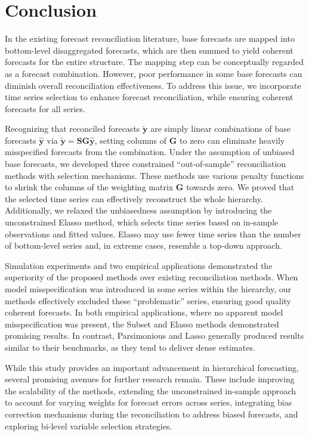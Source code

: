 \documentclass[
  11pt]{article}
\theoremstyle{plain}
\theoremstyle{remark}
\begin{document}
\section{Conclusion}\label{sec-conclusion}

In the existing forecast reconciliation literature, base forecasts are
mapped into bottom-level disaggregated forecasts, which are then summed
to yield coherent forecasts for the entire structure. The mapping step
can be conceptually regarded as a forecast combination. However, poor
performance in some base forecasts can diminish overall reconciliation
effectiveness. To address this issue, we incorporate time series
selection to enhance forecast reconciliation, while ensuring coherent
forecasts for all series.

Recognizing that reconciled forecasts \(\tilde{\bm{y}}\) are simply
linear combinations of base forecasts \(\hat{\bm{y}}\) via
\(\tilde{\bm{y}}=\bm{SG}\hat{\bm{y}}\), setting columns of \(\bm{G}\) to
zero can eliminate heavily misspecified forecasts from the combination.
Under the assumption of unbiased base forecasts, we developed three
constrained ``out-of-sample'' reconciliation methods with selection
mechanisms. These methods use various penalty functions to shrink the
columns of the weighting matrix \(\bm{G}\) towards zero. We proved that
the selected time series can effectively reconstruct the whole
hierarchy. Additionally, we relaxed the unbiasedness assumption by
introducing the unconstrained Elasso method, which selects time series
based on in-sample observations and fitted values. Elasso may use fewer
time series than the number of bottom-level series and, in extreme
cases, resemble a top-down approach.

Simulation experiments and two empirical applications demonstrated the
superiority of the proposed methods over existing reconciliation
methods. When model misspecification was introduced in some series
within the hierarchy, our methods effectively excluded these
``problematic'' series, ensuring good quality coherent forecasts. In
both empirical applications, where no apparent model misspecification
was present, the Subset and Elasso methods demonstrated promising
results. In contrast, Parsimonious and Lasso generally produced results
similar to their benchmarks, as they tend to deliver dense estimates.

While this study provides an important advancement in hierarchical
forecasting, several promising avenues for further research remain.
These include improving the scalability of the methods, extending the
unconstrained in-sample approach to account for varying weights for
forecast errors across series, integrating bias correction mechanisms
during the reconciliation to address biased forecasts, and exploring
bi-level variable selection strategies.
\end{document}
